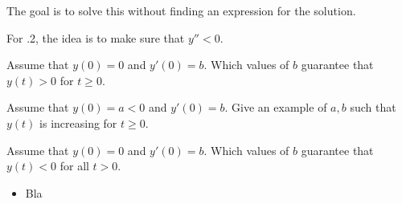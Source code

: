 \begin{annotation}
\begin{goals}
	The goal is to solve this without finding an expression for the solution.
	
	For .2, the idea is to make sure that $y''<0$. 
\end{goals}	
\end{annotation}
	\begin{parts}
		\item Assume that $y(0)=0$ and $y'(0)=b$. Which values of $b$ guarantee that $y(t)>0$ for $t\geq 0$. 
		\item Assume that $y(0)=a<0$ and $y'(0)=b$. Give an example of $a,b$ such that $y(t)$ is increasing for $t\geq 0$. 
		\item Assume that $y(0)=0$ and $y'(0)=b$. Which values of $b$ guarantee that $y(t)<0$ for all $t>0$.

%

	\end{parts}


	

\bookonlynewpage

\begin{lesson}

	\begin{itemize}
		\item Bla
	\end{itemize}
	

\end{lesson}

